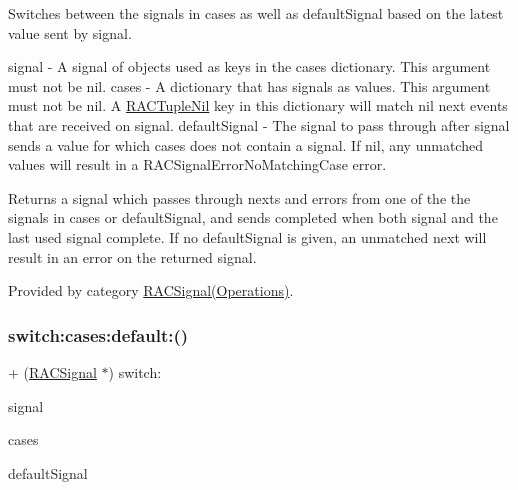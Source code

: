 Switches between the signals in {\ttfamily cases} as well as {\ttfamily default\+Signal} based on the latest value sent by {\ttfamily signal}.

signal -\/ A signal of objects used as keys in the {\ttfamily cases} dictionary. This argument must not be nil. cases -\/ A dictionary that has signals as values. This argument must not be nil. A \mbox{\hyperlink{interface_r_a_c_tuple_nil}{R\+A\+C\+Tuple\+Nil}} key in this dictionary will match nil {\ttfamily next} events that are received on {\ttfamily signal}. default\+Signal -\/ The signal to pass through after {\ttfamily signal} sends a value for which {\ttfamily cases} does not contain a signal. If nil, any unmatched values will result in a R\+A\+C\+Signal\+Error\+No\+Matching\+Case error.

Returns a signal which passes through {\ttfamily next}s and {\ttfamily error}s from one of the the signals in {\ttfamily cases} or {\ttfamily default\+Signal}, and sends {\ttfamily completed} when both {\ttfamily signal} and the last used signal complete. If no {\ttfamily default\+Signal} is given, an unmatched {\ttfamily next} will result in an error on the returned signal. 

Provided by category \mbox{\hyperlink{category_r_a_c_signal_07_operations_08_aac7816b22cfdcbe65cd43d99836ba1f5}{R\+A\+C\+Signal(\+Operations)}}.

\mbox{\label{interface_r_a_c_signal_aac7816b22cfdcbe65cd43d99836ba1f5}} 
\subsubsection{\texorpdfstring{switch\+:cases\+:default\+:()}{switch:cases:default:()}\hspace{0.1cm}{\footnotesize\ttfamily [2/3]}}
{\footnotesize\ttfamily + (\mbox{\hyperlink{interface_r_a_c_signal}{R\+A\+C\+Signal}} $\ast$) switch\+: \begin{DoxyParamCaption}\item[{(\mbox{\hyperlink{interface_r_a_c_signal}{R\+A\+C\+Signal}} $\ast$)}]{signal }\item[{cases:(N\+S\+Dictionary $\ast$)}]{cases }\item[{default:(\mbox{\hyperlink{interface_r_a_c_signal}{R\+A\+C\+Signal}} $\ast$)}]{default\+Signal }\end{DoxyParamCaption}}

